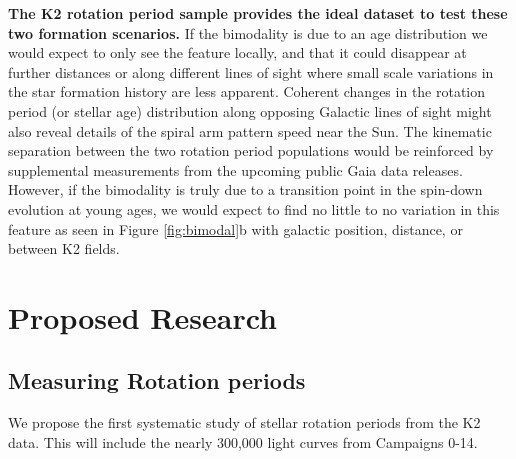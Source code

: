 \documentclass[12pt]{article}
\newcommand{\racomment}[1]{{\color{red}#1}}
\begin{document}
{\bf The K2 rotation period sample provides the ideal dataset to test these two formation scenarios.} If the bimodality is due to an age distribution we would expect to only see the feature locally, and that it could disappear at further distances or along different lines of sight where small scale variations in the star formation history are less apparent. Coherent changes in the rotation period (or stellar age) distribution along opposing Galactic lines of sight might also reveal details of the spiral arm pattern speed near the Sun. The kinematic separation between the two rotation period populations would be reinforced by supplemental measurements from the upcoming public Gaia data releases. However, if the bimodality is truly due to a transition point in the spin-down evolution at young ages, we would expect to find no little to no variation in this feature as seen in Figure \ref{fig:bimodal}b with galactic position, distance, or between K2 fields.






\section{Proposed Research}
\subsection{Measuring Rotation periods}
We propose the first systematic study of stellar rotation periods from the K2
data. This will include the nearly 300,000 light curves from Campaigns 0-14.
\end{document}

